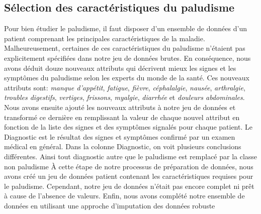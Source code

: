 \subsection{Sélection  des caractéristiques du paludisme}
Pour bien étudier le paludisme, il faut disposer d’un ensemble de données d’un  patient comprenant les principales caractéristiques de la maladie.  Malheureusement, certaines de ces caractéristiques du paludisme n’étaient pas explicitement spécifiées dans notre jeu de données brutes. En conséquence, nous avons déduit douze nouveaux attributs qui décrivent mieux les signes et les symptômes du paludisme selon les experts du monde de la santé. Ces nouveaux attributs sont: \emph{manque d’appétit}, \emph{fatigue}, \emph{fièvre}, \emph{céphalalgie}, \emph{nausée}, \emph{arthralgie}, \emph{troubles digestifs}, \emph{vertiges}, \emph{frissons}, \emph{myalgie}, \emph{diarrhée} et \emph{douleurs abdominales}. Nous avons ensuite ajouté les nouveaux attributs à notre jeu de données et transformé ce dernière en remplissant la valeur de chaque nouvel attribut en fonction de la liste des signes et des symptômes signalés pour chaque patient.
Le Diagnostic est le résultat des signes et symptômes confirmé par un examen médical en général. Dans la colonne Diagnostic, on voit plusieurs conclusions différentes. Ainsi tout diagnostic autre que le paludisme est remplacé par la classe non paludisme
À cette étape de notre processus de préparation de données, nous avons créé un jeu de données patient contenant les caractéristiques requises pour le paludisme. Cependant, notre jeu de données n'était pas encore complet ni prêt à cause de l'absence de valeurs. Enfin, nous avons complété notre ensemble de données en utilisant une approche d’imputation des données robuste
